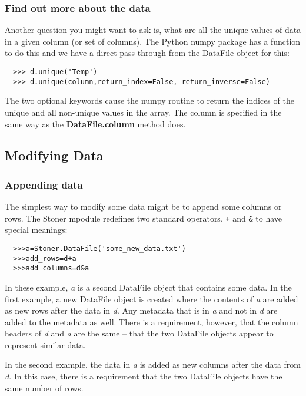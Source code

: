 \documentclass[a4paper,11pt]{scrartcl}
\begin{document}
\subsubsection{Find out more about the data}

Another question you might want to ask is, what are all the unique
values of data in a given column (or set of columns). The Python numpy
package has a function to do this and we have a direct pass through
from the DataFile object for this:

\begin{verbatim}
  >>> d.unique('Temp')
  >>> d.unique(column,return_index=False, return_inverse=False)
\end{verbatim}

The two optional keywords cause the numpy routine to return the
indices of the unique and all non-unique values in the array. The
column is specified in the same way as the \textbf{DataFile.column}
method does.


\subsection{Modifying Data}

\subsubsection{Appending data}

The simplest way to modify some data might be to append some columns or rows. The Stoner mpodule redefines two standard operators, \verb:+: and \verb:&: to have special meanings:
\begin{verbatim}
  >>>a=Stoner.DataFile('some_new_data.txt')
  >>>add_rows=d+a
  >>>add_columns=d&a
\end{verbatim}
In these example, \textit{a} is a second DataFile object that contains some data. In the first example, a new DataFile object is created where the contents of \textit{a} are added as new rows after the data in \textit{d}. Any metadata that is in \textit{a} and not in \textit{d} are added to the metadata as well. There is a requirement, however, that the column headers of \textit{d} and \textit{a} are the same -- \ie that the two DataFile objects appear to represent similar data.

In the second example, the data in \textit{a} is added as new columns after the data from \textit{d}. In this case, there is a requirement that the two DataFile objects have the same number of rows.
\end{document}
